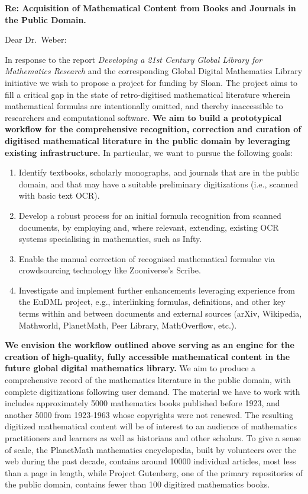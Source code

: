 \documentclass[10pt,letterpaper]{article}
\begin{document}
\thispagestyle{empty}

\noindent\textbf{Re: \quad Acquisition of Mathematical Content from Books and Journals in the Public Domain.}

\bigskip

\noindent Dear Dr.~Weber:

\bigskip

In response to the report \emph{Developing a 21st Century Global
  Library for Mathematics Research} and the corresponding Global
Digital Mathematics Library initiative we wish to propose a project
for funding by Sloan.  The project aims to fill a critical gap in the
state of retro-digitised mathematical literature wherein mathematical
formulas are intentionally omitted, and thereby inaccessible to
researchers and computational software.  \textbf{We aim to build a
  prototypical workflow for the comprehensive recognition, correction
  and curation of digitised mathematical literature in the public
  domain by leveraging existing infrastructure.} In particular, we
want to pursue the following goals:
\begin{enumerate}
\item Identify textbooks, scholarly monographs, and journals that are
  in the public domain, and that may have a suitable preliminary
  digitizations (i.e., scanned with basic text OCR).
\item Develop a robust process for an initial formula recognition from scanned 
documents, by employing and, where relevant, extending, existing OCR systems 
specialising in mathematics, such as {\sf Infty}.
\item Enable 
the manual correction of recognised mathematical formulae via crowdsourcing 
technology like Zooniverse's {\sf Scribe}.
\item Investigate and implement further enhancements leveraging
  experience from the EuDML project, e.g., interlinking formulas,
  definitions, and other key terms within and between documents and
  external sources (arXiv, Wikipedia, Mathworld, PlanetMath, Peer
  Library, MathOverflow, etc.).
\end{enumerate}
\textbf{We envision the workflow outlined above serving as an engine
  for the creation of high-quality, fully accessible mathematical
  content in the future global digital mathematics library.}  We aim
to produce a comprehensive record of the mathematics literature in the
public domain, with complete digitizations following user demand.  The
material we have to work with includes approximately 5000 mathematics
books published before 1923, and another 5000 from 1923-1963 whose
copyrights were not renewed.  The resulting digitized mathematical
content will be of interest to an audience of mathematics
practitioners and learners as well as historians and other scholars.
To give a sense of scale, the PlanetMath mathematics encyclopedia,
built by volunteers over the web during the past decade, contains
around 10000 individual articles, most less than a page in length,
while Project Gutenberg, one of the primary repositories of the public
domain, contains fewer than 100 digitized mathematics books.
\end{document}
